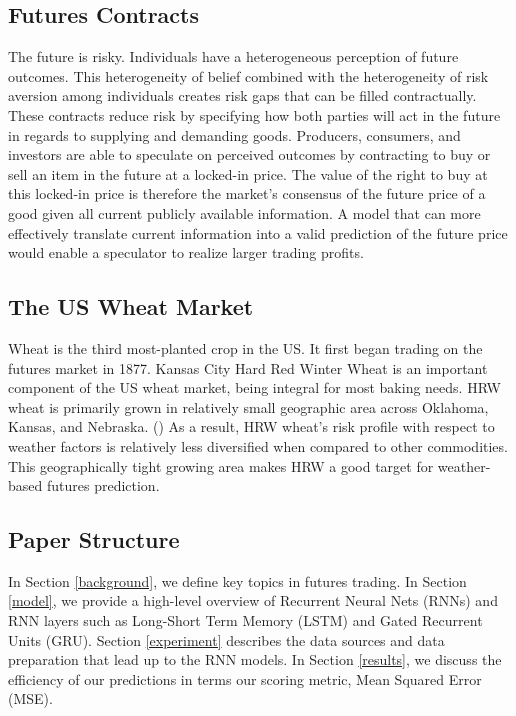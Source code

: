 \documentclass[twoside,11pt]{article}
\begin{document}
\subsection{Futures Contracts}
The future is risky. Individuals have a heterogeneous perception of future outcomes. This heterogeneity of belief combined with the heterogeneity of risk aversion among individuals creates risk gaps that can be filled contractually. These contracts reduce risk by specifying how both parties will act in the future in regards to supplying and demanding goods. Producers, consumers, and investors are able to speculate on perceived outcomes by contracting to buy or sell an item in the future at a locked-in price. The value of the right to buy at this locked-in price is therefore the market's consensus of the future price of a good given all current publicly available information. A model that can more effectively translate current information into a valid prediction of the future price would enable a speculator to realize larger trading profits.

\subsection{The US Wheat Market}
Wheat is the third most-planted crop in the US. It first began trading on the futures market in 1877. Kansas City Hard Red Winter Wheat is an important component of the US wheat market, being integral for most baking needs. HRW wheat is primarily grown in relatively small geographic area across Oklahoma, Kansas, and Nebraska. (\cite{CME}) As a result, HRW wheat's risk profile with respect to weather factors is relatively less diversified when compared to other commodities. This geographically tight growing area makes HRW a good target for weather-based futures prediction. 

\subsection{Paper Structure}
In Section \ref{background}, we define key topics in futures trading. In Section \ref{model}, we provide a high-level overview of Recurrent Neural Nets (RNNs) and RNN layers such as Long-Short Term Memory (LSTM) and Gated Recurrent Units (GRU). Section \ref{experiment} describes the data sources and data preparation that lead up to the RNN models.  In Section \ref{results}, we discuss the efficiency of our predictions in terms our scoring metric, Mean Squared Error (MSE). 
\end{document}
